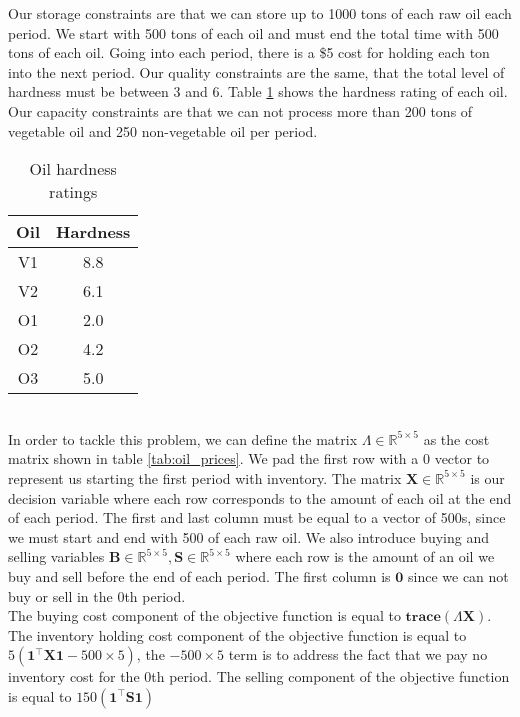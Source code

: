 Our storage constraints are that we can store up to 1000 tons of each raw oil each period. 
We start with 500 tons of each oil and must end the total time with 500 tons of each oil.
Going into each period, there is a \$5 cost for holding each ton into the next period.
Our quality constraints are the same, that the total level of hardness must be between 3 and 6. 
Table \ref{tab:oil_hardness} shows the hardness rating of each oil.
Our capacity constraints are that we can not process more than 200 tons of vegetable oil and 250 non-vegetable oil per period. 
\begin{table}[h!]
\centering
\begin{tabular}{|c|c|}
\hline
Oil & Hardness \\ \hline
V1  & 8.8 \\ \hline
V2  & 6.1 \\ \hline
O1  & 2.0 \\ \hline
O2  & 4.2 \\ \hline
O3  & 5.0 \\ \hline
\end{tabular}
\caption{Oil hardness ratings}
\label{tab:oil_hardness}
\end{table}
\\
In order to tackle this problem, we can define the matrix $\Lambda \in \mathbb{R}^{5 \times 5}$  as the cost matrix shown in table \ref{tab:oil_prices}. 
We pad the first row with a 0 vector to represent us starting the first period with inventory.
The matrix $\textbf{X} \in \mathbb{R}^{5 \times 5}$ is our decision variable where each row corresponds to the amount of each oil at the end of each period. 
The first and last column must be equal to a vector of 500s, since we must start and end with 500 of each raw oil.
We also introduce buying and selling variables $\textbf{B} \in \mathbb{R}^{5 \times 5}, \textbf{S} \in \mathbb{R}^{5 \times 5}$ where each row is the amount of an oil we buy and sell before the end of each period.
The first column is $\textbf{0}$ since we can not buy or sell in the 0th period. 
\\
The buying cost component of the objective function is equal to $\textbf{trace}(\Lambda \textbf{X})$.
The inventory holding cost component of the objective function is equal to $5 (\textbf{1}^\top \textbf{X} \textbf{1} - 500 \times 5)$, the $-500 \times 5$ term is to address the fact that we pay no inventory cost for the 0th period.
The selling component of the objective function is equal to $150(\textbf{1}^\top \textbf{S} \textbf{1})$

